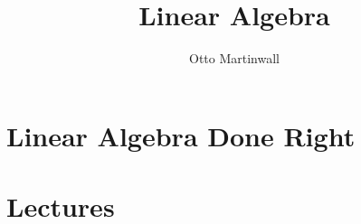 

\title{Linear Algebra}
\author{Otto Martinwall}


\maketitle
\tableofcontents
\newpage

\newtheorem{definition}{Definition}
\newtheorem{theorem}{Theorem}

\section{Linear Algebra Done Right}


\section{Lectures}

